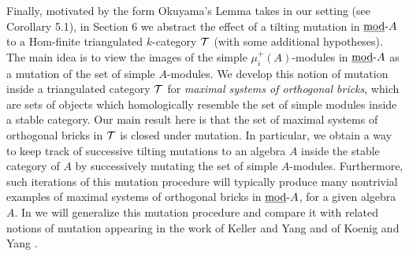 \documentclass{amsart}
\begin{document}
   
Finally, motivated by the form Okuyama's Lemma takes in our setting (see Corollary 5.1), in Section 6 we abstract the effect of a tilting mutation in $\mbox{\underline{mod}-} A$ to a Hom-finite triangulated $k$-category $\mathcal{T}$ (with some additional hypotheses).  The main idea is to view the images of the simple $\mu^+_i(A)$-modules in $\mbox{\underline{mod}-} A$ as a mutation of the set of simple $A$-modules.  We develop this notion of mutation inside a triangulated category $\mathcal{T}$ for {\it maximal systems of orthogonal bricks}, which are sets of objects which homologically resemble the set of simple modules inside a stable category.  Our main result here is that the set of maximal systems of orthogonal bricks in $\mathcal{T}$ is closed under mutation.  In particular, we obtain a way to keep track of successive tilting mutations to an algebra $A$ inside the stable category of $A$ by successively mutating the set of simple $A$-modules.  Furthermore, such iterations of this mutation procedure will typically produce many nontrivial examples of maximal systems of orthogonal bricks in $\mbox{\underline{mod}-} A$, for a given algebra $A$.   In \cite{SMS} we will generalize this mutation procedure and compare it with related notions of mutation appearing in the work of Keller and Yang \cite{KellYang} and of Koenig and Yang \cite{KoYa}.
 
\end{document}
